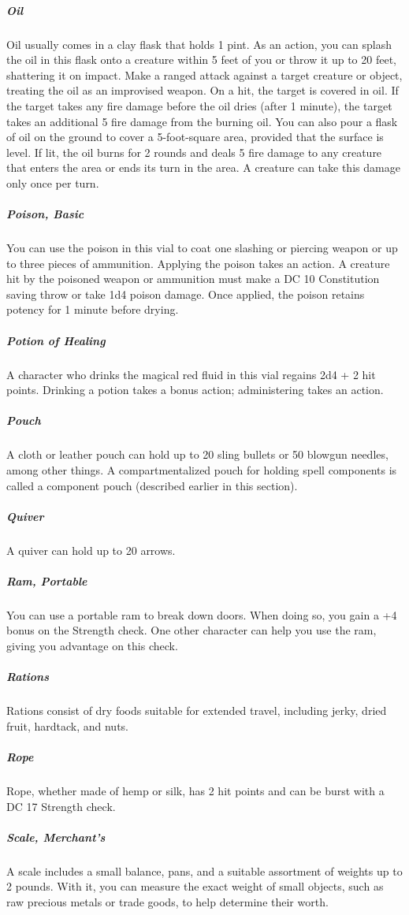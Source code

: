 \subparagraph*{Oil} Oil usually comes in a clay flask that holds 1 pint. As an action, you can splash the oil in this flask onto a creature within 5 feet of you or throw it up to 20 feet, shattering it on impact. Make a ranged attack against a target creature or object, treating the oil as an improvised weapon. On a hit, the target is covered in oil. If the target takes any fire damage before the oil dries (after 1 minute), the target takes an additional 5 fire damage from the burning oil. You can also pour a flask of oil on the ground to cover a 5-foot-square area, provided that the surface is level. If lit, the oil burns for 2 rounds and deals 5 fire damage to any creature that enters the area or ends its turn in the area. A creature can take this damage only once per turn.

\subparagraph*{Poison, Basic} You can use the poison in this vial to coat one slashing or piercing weapon or up to three pieces of ammunition. Applying the poison takes an action. A creature hit by the poisoned weapon or ammunition must make a DC 10 Constitution saving throw or take 1d4 poison damage. Once applied, the poison retains potency for 1 minute before drying.

\subparagraph*{Potion of Healing} A character who drinks the magical red fluid in this vial regains 2d4 + 2 hit points. Drinking a potion takes a bonus action; administering takes an action.

\subparagraph*{Pouch} A cloth or leather pouch can hold up to 20 sling bullets or 50 blowgun needles, among other things. A compartmentalized pouch for holding spell components is called a component pouch (described earlier in this section). 

\subparagraph*{Quiver} A quiver can hold up to 20 arrows.

\subparagraph*{Ram, Portable} You can use a portable ram to break down doors. When doing so, you gain a +4 bonus on the Strength check. One other character can help you use the ram, giving you advantage on this check.

\subparagraph*{Rations} Rations consist of dry foods suitable for extended travel, including jerky, dried fruit, hardtack, and nuts.

\subparagraph*{Rope} Rope, whether made of hemp or silk, has 2 hit points and can be burst with a DC 17 Strength check.

\subparagraph*{Scale, Merchant's} A scale includes a small balance, pans, and a suitable assortment of weights up to 2 pounds. With it, you can measure the exact weight of small objects, such as raw precious metals or trade goods, to help determine their worth.

